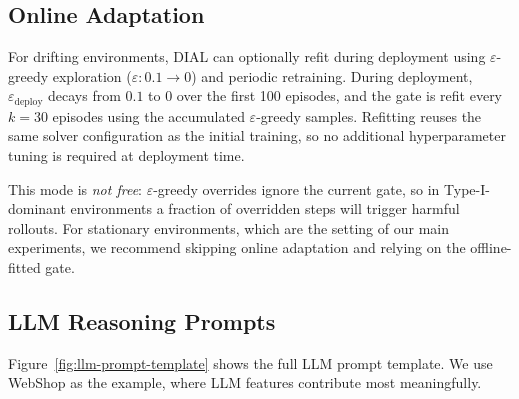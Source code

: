 \subsection{Online Adaptation}
\label{app:online-adaptation}

For drifting environments, DIAL can optionally refit during
deployment using $\varepsilon$-greedy exploration
($\varepsilon: 0.1 \to 0$) and periodic retraining. During
deployment, $\varepsilon_{\text{deploy}}$ decays from $0.1$
to $0$ over the first 100 episodes, and the gate is refit every
$k = 30$ episodes using the accumulated $\varepsilon$-greedy
samples. Refitting reuses the same solver configuration as the
initial training, so no additional hyperparameter tuning is
required at deployment time.

This mode is \emph{not free}: $\varepsilon$-greedy overrides
ignore the current gate, so in Type-I-dominant environments a
fraction of overridden steps will trigger harmful rollouts. For stationary
environments, which are the setting of our main experiments,
we recommend skipping online adaptation and relying on the
offline-fitted gate.

\subsection{LLM Reasoning Prompts}
\label{app:llm-prompts}

Figure~\ref{fig:llm-prompt-template} shows the full LLM prompt
template. We use WebShop as the example, where LLM features
contribute most meaningfully.

